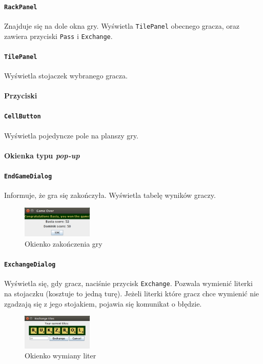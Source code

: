 \documentclass[a4paper]{article}
\begin{document}
\paragraph{\texttt{RackPanel}} Znajduje się na dole okna gry. Wyświetla \texttt{TilePanel} obecnego gracza, oraz zawiera przyciski \texttt{Pass} i \texttt{Exchange}.
\paragraph{\texttt{TilePanel}} Wyświetla stojaczek wybranego gracza.
\paragraph{Przyciski}
\paragraph{\texttt{CellButton}} Wyświetla pojedyncze pole na planszy gry.

\newpage
\paragraph{Okienka typu \textit{pop-up}}
\paragraph{\texttt{EndGameDialog}} Informuje, że gra się zakończyła. Wyświetla tabelę wyników graczy.

\begin{figure}[ht]
\centering
\includegraphics[width=0.3\textwidth]{3.png}
\caption{Okienko zakończenia gry}
\end{figure}

\paragraph{\texttt{ExchangeDialog}} Wyświetla się, gdy gracz, naciśnie przycisk \texttt{Exchange}. Pozwala wymienić literki na stojaczku (kosztuje to jedną turę).
Jeżeli literki które gracz chce wymienić nie zgadzają się z jego stojakiem, pojawia się komunikat o błędzie.

\begin{figure}[!ht]
\centering
\includegraphics[width=0.3\textwidth]{2.png}
\caption{Okienko wymiany liter}
\end{figure}
\end{document}
